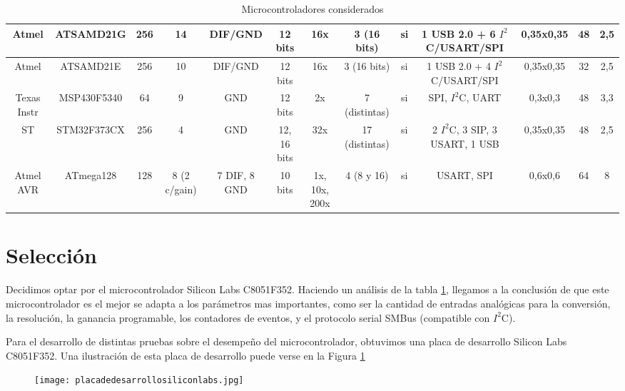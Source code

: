 \begin{landscape}
\begin{table}[!]
\begin{flushleft}
{\begin{tabular}{|c|c|c|c|c|c|c|c|c|c|c|c|c|}
\hline
 Atmel & ATSAMD21G &    256 &     14 & DIF/GND & 12 bits &    16x & 3 (16 bits) &     si & 1 USB 2.0 + 6 $I^{2}$C/USART/SPI & 0,35x0,35 &     48 &    2,5 \\
\hline
 Atmel & ATSAMD21E &    256 &     10 & DIF/GND & 12 bits &    16x & 3 (16 bits) &     si & 1 USB 2.0 + 4 $I^{2}$C/USART/SPI & 0,35x0,35 &     32 &    2,5 \\
\hline
Texas Instr & MSP430F5340 &     64 &      9 &    GND & 12 bits &     2x & 7 (distintas) &     si & SPI, $I^{2}$C, UART & 0,3x0,3 &     48 &    3,3 \\
\hline
    ST & STM32F373CX &    256 &      4 &    GND & 12, 16 bits &    32x & 17 (distintas) &     si & 2 $I^{2}$C, 3 SIP, 3 USART, 1 USB & 0,35x0,35 &     48 &    2,5 \\
\hline
Atmel AVR & ATmega128 &    128 & 8 (2 c/gain) & 7 DIF, 8 GND & 10 bits & 1x, 10x, 200x & 4 (8 y 16) &     si & USART, SPI & 0,6x0,6 &     64 &      8 \\
\hline
\end{tabular}



}
\end{flushleft}
  \caption{Microcontroladores considerados}\label{tabla_micros}
\end{table}

\end{landscape}




\section{Selección} %
\label{it1:sec:seleccion}

Decidimos optar por el microcontrolador Silicon Labs C8051F352. Haciendo un análisis de la tabla \ref{tabla_micros}, llegamos a la conclusión de que este microcontrolador es el mejor se adapta a los parámetros mas importantes, como ser la cantidad de entradas analógicas para la conversión, la resolución, la ganancia programable, los contadores de eventos, y el protocolo serial SMBus (compatible con $I^{2}$C).

Para el desarrollo de distintas pruebas sobre el desempeño del microcontrolador, obtuvimos una placa de desarrollo Silicon Labs C8051F352. Una ilustración de esta placa de desarrollo puede verse en la Figura \ref{fig:placadedesarrollosiliconlabs}

\begin{figure}[h]
  \centering
  \texttt{[image: placadedesarrollosiliconlabs.jpg]}
  \caption{}\label{fig:placadedesarrollosiliconlabs}
\end{figure}




